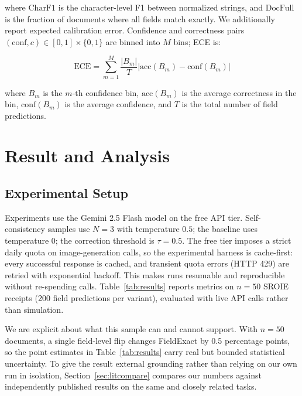 \documentclass[conference]{IEEEtran}
\begin{document}
where \(\text{CharF1}\) is the character-level F1 between normalized strings, and \(\text{DocFull}\) is the fraction of documents where all fields match exactly. We additionally report expected calibration error. Confidence and correctness pairs \((\text{conf}, c) \in [0,1] \times \{0,1\}\) are binned into \(M\) bins; ECE is:

\[
\text{ECE} = \sum_{m=1}^{M} \frac{|B_m|}{T} \left| \text{acc}(B_m) - \text{conf}(B_m) \right|
\]

where \(B_m\) is the \(m\)-th confidence bin, \(\text{acc}(B_m)\) is the average correctness in the bin, \(\text{conf}(B_m)\) is the average confidence, and \(T\) is the total number of field predictions.

\section{Result and Analysis}
\label{sec:results}

\subsection{Experimental Setup}
\label{sec:expsetup}
Experiments use the Gemini 2.5 Flash model on the free API tier. Self-consistency samples use \(N=3\) with temperature \(0.5\); the baseline uses temperature \(0\); the correction threshold is \(\tau = 0.5\). The free tier imposes a strict daily quota on image-generation calls, so the experimental harness is cache-first: every successful response is cached, and transient quota errors (HTTP 429) are retried with exponential backoff. This makes runs resumable and reproducible without re-spending calls. Table~\ref{tab:results} reports metrics on \(n=50\) SROIE receipts (200 field predictions per variant), evaluated with live API calls rather than simulation.

We are explicit about what this sample can and cannot support. With \(n=50\) documents, a single field-level flip changes FieldExact by 0.5 percentage points, so the point estimates in Table~\ref{tab:results} carry real but bounded statistical uncertainty. To give the result external grounding rather than relying on our own run in isolation, Section~\ref{sec:litcompare} compares our numbers against independently published results on the same and closely related tasks.
\end{document}
